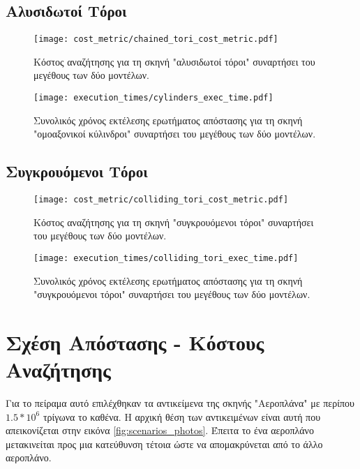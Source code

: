 \subsection{Αλυσιδωτοί Τόροι}
\begin{figure}[H]
    \centering
    \texttt{[image: cost\_metric/chained\_tori\_cost\_metric.pdf]}
    \caption[Κόστος Αναζήτησης για "αλυσιδωτοί τόροι"] {
        Κόστος αναζήτησης για τη σκηνή "αλυσιδωτοί τόροι" συναρτήσει 
        του μεγέθους των δύο μοντέλων.
    }
\end{figure}

\begin{figure}[H]
    \centering
    \texttt{[image: execution\_times/cylinders\_exec\_time.pdf]}
    \caption[Συνολικός Χρόνος Εκτέλεσης για "ομοαξονικοί κύλινδροι"] {
        Συνολικός χρόνος εκτέλεσης ερωτήματος απόστασης 
        για τη σκηνή "ομοαξονικοί κύλινδροι" συναρτήσει του μεγέθους των δύο μοντέλων.
    }
\end{figure}

\subsection{Συγκρουόμενοι Τόροι}
\begin{figure}[H]
    \centering
    \texttt{[image: cost\_metric/colliding\_tori\_cost\_metric.pdf]}
    \caption[Κόστος Αναζήτησης για "συγκρουόμενοι τόροι"] {
        Κόστος αναζήτησης για τη σκηνή "συγκρουόμενοι τόροι" συναρτήσει 
        του μεγέθους των δύο μοντέλων.
    }
\end{figure}

\begin{figure}[H]
    \centering
    \texttt{[image: execution\_times/colliding\_tori\_exec\_time.pdf]}
    \caption[Συνολικός Χρόνος Εκτέλεσης για "συγκρουόμενοι τόροι"] {
        Συνολικός χρόνος εκτέλεσης ερωτήματος απόστασης 
        για τη σκηνή "συγκρουόμενοι τόροι" συναρτήσει του μεγέθους των δύο μοντέλων.
    }
\end{figure}


\section{Σχέση Απόστασης - Κόστους Αναζήτησης}
Για το πείραμα αυτό επιλέχθηκαν τα αντικείμενα της σκηνής 
"Αεροπλάνα" με περίπου $1.5 * 10^6$ τρίγωνα το καθένα.
Η αρχική θέση των αντικειμένων είναι αυτή που απεικονίζεται 
στην εικόνα \ref{fig:scenarios_photos}.
Έπειτα το ένα αεροπλάνο μετακινείται 
προς μια κατεύθυνση τέτοια ώστε να απομακρύνεται 
από το άλλο αεροπλάνο.


